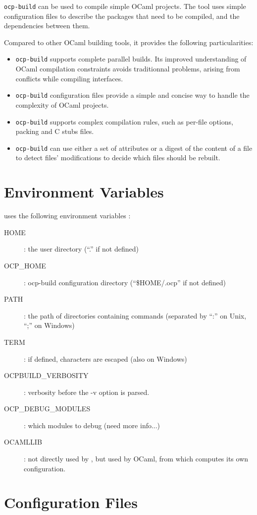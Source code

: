 {\tt ocp-build} can be used to compile simple OCaml projects.
The tool uses simple configuration files to describe the
packages that need to be compiled, and the dependencies between
them.

Compared to other OCaml building tools, it provides the following
particularities:
\begin{itemize}
\item {\tt ocp-build} supports complete parallel builds. Its improved
  understanding of OCaml compilation constraints avoids traditionnal
  problems, arising from conflicts while compiling interfaces.
\item {\tt ocp-build} configuration files provide a simple and concise
  way to handle the complexity of OCaml projects.
\item {\tt ocp-build} supports complex compilation rules, such as
  per-file options, packing and C stubs files.
\item {\tt ocp-build} can use either a set of attributes or a digest
  of the content of a file to detect files' modifications to decide
  which files should be rebuilt.
\end{itemize}

\section{Environment Variables}

\ocpbuild{} uses the following environment variables :
\begin{description}
\item[HOME] : the user directory (``.'' if not defined)
\item[OCP\_HOME] : ocp-build configuration directory (``\$HOME/.ocp''
  if not defined)
\item[PATH] : the path of directories containing commands (separated
  by ``:'' on Unix, ``;'' on Windows)
\item[TERM] : if defined, characters are escaped (also on Windows)
\item[OCPBUILD\_VERBOSITY] : verbosity before the -v option is parsed.
\item[OCP\_DEBUG\_MODULES] : which modules to debug (need more info...)
\item[OCAMLLIB] : not directly used by \ocpbuild{}, but used by OCaml,
  from which \ocpbuild{} computes its own configuration.
\end{description}

\section{Configuration Files}

